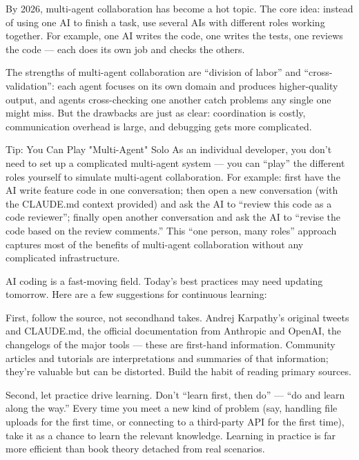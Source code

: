 
By 2026, multi-agent collaboration has become a hot topic. The core idea: instead of using one AI to finish a task, use several AIs with different roles working together. For example, one AI writes the code, one writes the tests, one reviews the code — each does its own job and checks the others.

The strengths of multi-agent collaboration are “division of labor” and “cross-validation”: each agent focuses on its own domain and produces higher-quality output, and agents cross-checking one another catch problems any single one might miss. But the drawbacks are just as clear: coordination is costly, communication overhead is large, and debugging gets more complicated.

\begin{tcbinfo}{Tip: You Can Play "Multi-Agent" Solo}
As an individual developer, you don't need to set up a complicated multi-agent system — you can “play” the different roles yourself to simulate multi-agent collaboration. For example: first have the AI write feature code in one conversation; then open a new conversation (with the CLAUDE.md context provided) and ask the AI to “review this code as a code reviewer”; finally open another conversation and ask the AI to “revise the code based on the review comments.” This “one person, many roles” approach captures most of the benefits of multi-agent collaboration without any complicated infrastructure.

\end{tcbinfo}


AI coding is a fast-moving field. Today's best practices may need updating tomorrow. Here are a few suggestions for continuous learning:

First, follow the source, not secondhand takes. Andrej Karpathy's original tweets and CLAUDE.md, the official documentation from Anthropic and OpenAI, the changelogs of the major tools — these are first-hand information. Community articles and tutorials are interpretations and summaries of that information; they're valuable but can be distorted. Build the habit of reading primary sources.

Second, let practice drive learning. Don't “learn first, then do” — “do and learn along the way.” Every time you meet a new kind of problem (say, handling file uploads for the first time, or connecting to a third-party API for the first time), take it as a chance to learn the relevant knowledge. Learning in practice is far more efficient than book theory detached from real scenarios.

